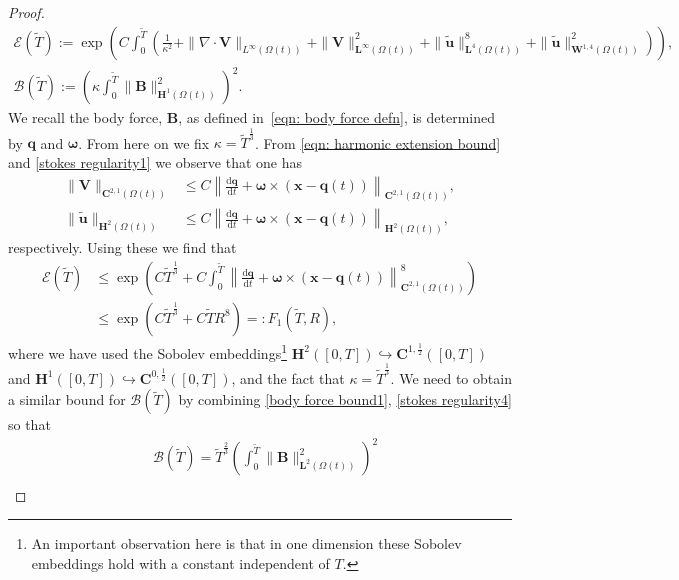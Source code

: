 \documentclass[a4paper]{amsart}
\numberwithin{equation}{section}
\newcommand{\Div}{\nabla \cdot}
\theoremstyle{plain}
\newcommand{\mbf}[1]{\mathbf{#1}}
\begin{document}
\begin{proof}
    \begin{gather*}
            \mathcal{E}(\widetilde{T}) := \exp\left(C\int_0^{\widetilde{T}} \left(\frac{1}{\kappa^2} + \|\Div\mbf{V}\|_{L^\infty(\Omega(t))} + \|\mbf{V}\|_{\mbf{L}^\infty(\Omega(t))}^2 +\|\widetilde{\mbf{u}}\|_{\mbf{L}^4(\Omega(t))}^8 +\|\widetilde{\mbf{u}}\|_{\mbf{W}^{1,4}(\Omega(t))}^2\right)\right),\\
            \mathcal{B}(\widetilde{T}) := \left(\kappa \int_0^{\widetilde{T}} \|\mbf{B}\|_{\mbf{H}^1(\Omega(t))}^2\right)^2.
        \end{gather*}
    We recall the body force, $\mbf{B}$, as defined in~\eqref{eqn: body force defn}, is determined by $\mbf{q}$ and $\boldsymbol{\omega}$.
    From here on we fix $\kappa = \widetilde{T}^{\frac{1}{3}}$.
	From \eqref{eqn: harmonic extension bound} and \eqref{stokes regularity1} we observe that one has
	\begin{align*}
		\|\mbf{V}\|_{\mbf{C}^{2,1}(\Omega(t))} &\leq C \left\| \frac{\mathrm{d}\mbf{q}}{\mathrm{d}t} + \boldsymbol{\omega} \times (\mbf{x} - \mbf{q}(t)) \right\|_{\mbf{C}^{2,1}(\Omega(t))},\\
        \|\widetilde{\mbf{u}}\|_{\mbf{H}^2(\Omega(t))} &\leq C \left\| \frac{\mathrm{d}\mbf{q}}{\mathrm{d}t} + \boldsymbol{\omega} \times (\mbf{x} - \mbf{q}(t)) \right\|_{\mbf{H}^{2}(\Omega(t))},
	\end{align*}
    respectively.
    Using these we find that
    \begin{align*}
        \mathcal{E}(\widetilde{T}) &\leq \exp\left(C\widetilde{T}^{\frac{1}{3}} + C \int_0^{\widetilde{T}} \left\| \frac{\mathrm{d}\mbf{q}}{\mathrm{d}t} + \boldsymbol{\omega} \times (\mbf{x} - \mbf{q}(t)) \right\|_{\mbf{C}^{2,1}(\Omega(t))}^8 \right)\\
        &\leq \exp\left(C \widetilde{T}^{\frac{1}{3}} + C \widetilde{T} R^8\right) =: F_1(\widetilde{T}, R),
    \end{align*}
    where we have used the Sobolev embeddings\footnote{An important observation here is that in one dimension these Sobolev embeddings hold with a constant independent of $T$.} $\mbf{H}^2([0,T]) \hookrightarrow \mbf{C}^{1,\frac{1}{2}}([0,T])$ and $\mbf{H}^1([0,T]) \hookrightarrow \mbf{C}^{0,\frac{1}{2}}([0,T])$, and the fact that $\kappa = \widetilde{T}^{\frac{1}{3}}$.
    We need to obtain a similar bound for $\mathcal{B}(\widetilde{T})$ by combining \eqref{body force bound1}, \eqref{stokes regularity4} so that
    \begin{align*}
        &\mathcal{B}(\widetilde{T}) = \widetilde{T}^{\frac{2}{3}}\left(\int_0^{\widetilde{T}} \|\mbf{B}\|_{\mbf{L}^2(\Omega(t))}^2\right)^2\\

\end{align*}
\end{proof}
\end{document}
